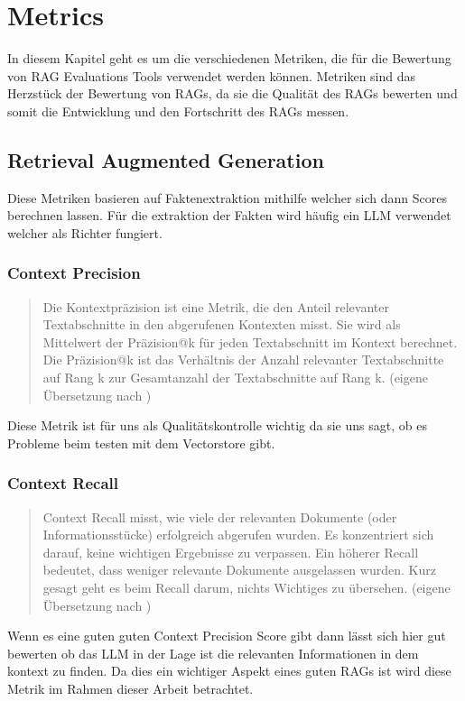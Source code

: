 \chapter{Metrics}

\label{chap:formal}
In diesem Kapitel geht es um die verschiedenen Metriken, die für die Bewertung von RAG Evaluations Tools verwendet werden können.
Metriken sind das Herzstück der Bewertung von RAGs, da sie die Qualität des RAGs bewerten und somit die Entwicklung und den Fortschritt des RAGs messen.


\section{Retrieval Augmented Generation}
Diese Metriken basieren auf Faktenextraktion mithilfe welcher sich dann Scores berechnen lassen.
Für die extraktion der Fakten wird häufig ein LLM verwendet welcher als Richter fungiert.


\subsection{Context Precision}
\begin{quote}
Die Kontextpräzision ist eine Metrik, die den Anteil relevanter Textabschnitte in den abgerufenen Kontexten misst.
Sie wird als Mittelwert der Präzision@k für jeden Textabschnitt im Kontext berechnet.
Die Präzision@k ist das Verhältnis der Anzahl relevanter Textabschnitte auf Rang k zur Gesamtanzahl der Textabschnitte auf Rang k.
(eigene Übersetzung nach \cite{ragas_context_precision})
\end{quote}
Diese Metrik ist für uns als Qualitätskontrolle wichtig da sie uns sagt, ob es Probleme beim testen mit dem Vectorstore gibt.

\subsection{Context Recall}
\begin{quote}
Context Recall misst, wie viele der relevanten Dokumente (oder Informationsstücke) erfolgreich abgerufen wurden.
Es konzentriert sich darauf, keine wichtigen Ergebnisse zu verpassen.
Ein höherer Recall bedeutet, dass weniger relevante Dokumente ausgelassen wurden.
Kurz gesagt geht es beim Recall darum, nichts Wichtiges zu übersehen.
(eigene Übersetzung nach \cite{ragas_context_recall})
\end{quote}

Wenn es eine guten guten Context Precision Score gibt dann lässt sich hier gut bewerten ob das LLM in der Lage ist die relevanten Informationen in dem kontext zu finden.
Da dies ein wichtiger Aspekt eines guten RAGs ist wird diese Metrik im Rahmen dieser Arbeit betrachtet.

